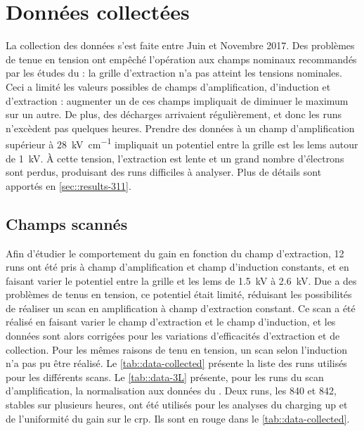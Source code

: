   \section{Données collectées}\label{sec::data-311}

    La collection des données s'est faite entre Juin et Novembre 2017. Des problèmes de tenue en tension ont empêché l'opération aux champs nominaux recommandés par les études du \threeL{} : la grille d'extraction n'a pas atteint les tensions nominales. Ceci a limité les valeurs possibles de champs d'amplification, d'induction et d'extraction : augmenter un de ces champs impliquait de diminuer le maximum sur un autre. De plus, des décharges arrivaient régulièrement, et donc les runs n'excèdent pas quelques heures. Prendre des données à un champ d'amplification supérieur à \SI{28}{\kilo\volt\per\centi\meter} impliquait un potentiel entre la grille est les \glspl{lem} autour de \SI{1}{\kilo\volt}. À cette tension, l'extraction est lente et un grand nombre d'électrons sont perdus, produisant des runs difficiles à analyser. Plus de détails sont apportés en \autoref{sec::results-311}.
 
    \subsection{Champs scannés}

      
      

      Afin d'étudier le comportement du gain en fonction du champ d'extraction, 12 runs ont été pris à champ d'amplification et champ d'induction constants, et en faisant varier le potentiel entre la grille et les \glspl{lem} de \SI{1.5}{\kilo\volt} à \SI{2.6}{\kilo\volt}. Due a des problèmes de tenus en tension, ce potentiel était limité, réduisant les possibilités de réaliser un scan en amplification à champ d'extraction constant. Ce scan a été réalisé en faisant varier le champ d'extraction et le champ d'induction, et les données sont alors corrigées pour les variations d'efficacités d'extraction et de collection. Pour les mêmes raisons de tenu en tension, un scan selon l'induction n'a pas pu être réalisé. Le \autoref{tab::data-collected} présente la liste des runs utilisés pour les différents scans. Le \autoref{tab::data-3L} présente, pour les runs du scan d'amplification, la normalisation aux données du \threeL{}. Deux runs, les 840 et 842, stables sur plusieurs heures, ont été utilisés pour les analyses du charging up et de l'uniformité du gain sur le \gls{crp}. Ils sont en rouge dans le \autoref{tab::data-collected}.

